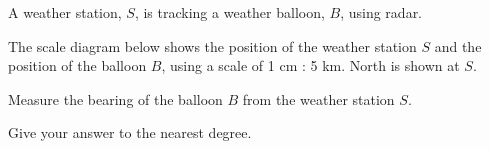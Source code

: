 \begin{question}
\noindent A weather station, $S$, is tracking a weather balloon, $B$, using radar.

\noindent The scale diagram below shows the position of the weather station $S$ and the position of the balloon $B$, using a scale of 1 cm : 5 km. North is shown at $S$.

\begin{center}
\end{center}

\noindent Measure the bearing of the balloon $B$ from the weather station $S$.

\noindent Give your answer to the nearest degree.

\vspace{4.5cm}

\begin{flushright}
\end{flushright}
\end{question}
